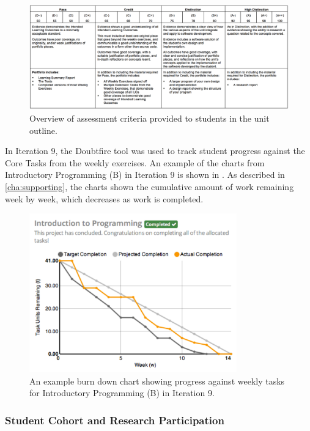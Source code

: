 \begin{figure}[htbp]
  \centering
  \includegraphics[width=\textwidth]{AssessmentCriteria}
  \caption{Overview of assessment criteria provided to students in the unit outline.}
  \label{fig:i9_assessment_criteria}
\end{figure}

In Iteration 9, the Doubtfire tool was used to track student progress against the Core Tasks from the weekly exercises. An example of the charts from Introductory Programming (B) in Iteration 9 is shown in . As described in \cref{cha:supporting}, the charts shown the cumulative amount of work remaining week by week, which decreases as work is completed. 

\begin{figure}[thbp]
  \centering
  \includegraphics[width=0.8\textwidth]{ExampleChart}
  \caption{An example burn down chart showing progress against weekly tasks for Introductory Programming (B) in Iteration 9.}
  \label{fig:progress_example_chart} 
\end{figure}


\subsubsection{Student Cohort and Research Participation} %
\label{sub:progress_student_cohort}

